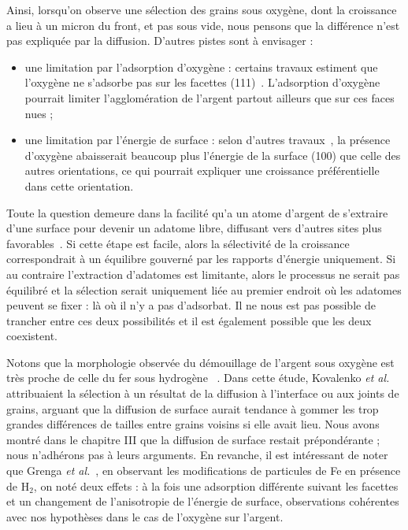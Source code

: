 Ainsi, lorsqu'on observe une sélection des grains sous oxygène, dont la croissance a lieu à un micron du front, et pas sous vide, nous pensons que la différence n'est pas expliquée par la diffusion. D'autres pistes sont à envisager :
\begin{itemize}
\item une limitation par l'adsorption d'oxygène : certains travaux estiment que l'oxygène ne s'adsorbe pas sur les facettes (111)~\cite{engelhardt1976adsorption}. L'adsorption d'oxygène pourrait limiter l'agglomération de l'argent partout ailleurs que sur ces faces \og nues \fg ;
\item une limitation par l'énergie de surface : selon d'autres travaux~\cite{molina2011size}, la présence d'oxygène abaisserait beaucoup plus l'énergie de la surface (100) que celle des autres orientations, ce qui pourrait expliquer une croissance préférentielle dans cette orientation.
\end{itemize}
Toute la question demeure dans la facilité qu'a un atome d'argent de s'extraire d'une surface pour devenir un adatome libre, diffusant vers d'autres sites plus favorables~\cite{combe00}. Si cette étape est facile, alors la sélectivité de la croissance correspondrait à un équilibre gouverné par les rapports d'énergie uniquement. Si au contraire l'extraction d'adatomes est limitante, alors le processus ne serait pas équilibré et la sélection serait uniquement liée au premier endroit où les adatomes peuvent se fixer : là où il n'y a pas d'adsorbat. Il ne nous est pas possible de trancher entre ces deux possibilités et il est également possible que les deux coexistent.\par
Notons que la morphologie observée du démouillage de l'argent sous oxygène est très proche de celle du fer sous hydrogène~\cite{kovalenko2013solid} . Dans cette étude, Kovalenko \textit{et al.} attribuaient la sélection à un résultat de la diffusion à l'interface ou aux joints de grains, arguant que la diffusion de surface aurait tendance à gommer les trop grandes différences de tailles entre grains voisins si elle avait lieu. Nous avons montré dans le chapitre III que la diffusion de surface restait prépondérante ; nous n'adhérons pas à leurs arguments. En revanche, il est intéressant de noter que Grenga \textit{et al.}~\cite{grenga1976surface}, en observant les modifications de particules de Fe en présence de H$_2$, on noté deux effets : à la fois une adsorption différente suivant les facettes et un changement de l'anisotropie de l'énergie de surface, observations cohérentes avec nos hypothèses dans le cas de l'oxygène sur l'argent.\par 

